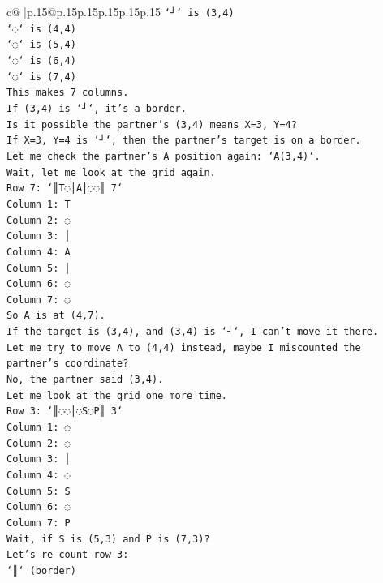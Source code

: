 \documentclass{article}
\begin{document}
{\begin{supertabular}{c@{$\;$}|p{.15\linewidth}@{}p{.15\linewidth}p{.15\linewidth}p{.15\linewidth}p{.15\linewidth}p{.15\linewidth}}
{{{\texttt{`┘` is (3,4)} \\
\texttt{`◌` is (4,4)} \\
\texttt{`◌` is (5,4)} \\
\texttt{`◌` is (6,4)} \\
\texttt{`◌` is (7,4)} \\
\texttt{This makes 7 columns.} \\
\texttt{If (3,4) is `┘`, it's a border.} \\
\texttt{Is it possible the partner's (3,4) means X=3, Y=4?} \\
\texttt{If X=3, Y=4 is `┘`, then the partner's target is on a border.} \\
\texttt{Let me check the partner's A position again: `A(3,4)`.} \\
\texttt{Wait, let me look at the grid again.} \\
\texttt{Row 7: `║T◌│A│◌◌║ 7`} \\
\texttt{Column 1: T} \\
\texttt{Column 2: ◌} \\
\texttt{Column 3: │} \\
\texttt{Column 4: A} \\
\texttt{Column 5: │} \\
\texttt{Column 6: ◌} \\
\texttt{Column 7: ◌} \\
\texttt{So A is at (4,7).} \\
\texttt{If the target is (3,4), and (3,4) is `┘`, I can't move it there.} \\
\texttt{Let me try to move A to (4,4) instead, maybe I miscounted the partner's coordinate?} \\
\texttt{No, the partner said (3,4).} \\
\texttt{Let me look at the grid one more time.} \\
\texttt{Row 3: `║◌◌│◌S◌P║ 3`} \\
\texttt{Column 1: ◌} \\
\texttt{Column 2: ◌} \\
\texttt{Column 3: │} \\
\texttt{Column 4: ◌} \\
\texttt{Column 5: S} \\
\texttt{Column 6: ◌} \\
\texttt{Column 7: P} \\
\texttt{Wait, if S is (5,3) and P is (7,3)?} \\
\texttt{Let's re{-}count row 3:} \\
\texttt{`║` (border)} \\
}}}
\end{supertabular}}
\end{document}
